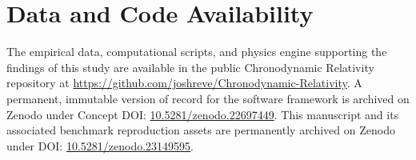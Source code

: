 \documentclass[aps,prd,reprint,superscriptaddress,nofootinbib,floatfix,amsmath,amssymb]{revtex4-2}
\begin{document}
\section*{Data and Code Availability}
The empirical data, computational scripts, and physics engine supporting the findings of this study are available in the public Chronodynamic Relativity repository at \url{https://github.com/joshreve/Chronodynamic-Relativity}. A permanent, immutable version of record for the software framework is archived on Zenodo under Concept DOI: \href{https://doi.org/10.5281/zenodo.22697449}{10.5281/zenodo.22697449}. This manuscript and its associated benchmark reproduction assets are permanently archived on Zenodo under DOI: \href{https://doi.org/10.5281/zenodo.23149595}{10.5281/zenodo.23149595}.


\end{document}

